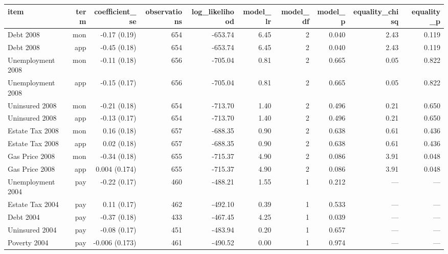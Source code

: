 \begin{tabular}{lrrrrrrrrr}
\toprule
item & term & coefficient\_se & observations & log\_likelihood & model\_lr & model\_df & model\_p & equality\_chisq & equality\_p \\
\midrule
Debt 2008 & mon & -0.17 (0.19) & 654 & -653.74 & 6.45 & 2 & 0.040 & 2.43 & 0.119 \\
Debt 2008 & app & -0.45 (0.18) & 654 & -653.74 & 6.45 & 2 & 0.040 & 2.43 & 0.119 \\
Unemployment 2008 & mon & -0.11 (0.18) & 656 & -705.04 & 0.81 & 2 & 0.665 & 0.05 & 0.822 \\
Unemployment 2008 & app & -0.15 (0.17) & 656 & -705.04 & 0.81 & 2 & 0.665 & 0.05 & 0.822 \\
Uninsured 2008 & mon & -0.21 (0.18) & 654 & -713.70 & 1.40 & 2 & 0.496 & 0.21 & 0.650 \\
Uninsured 2008 & app & -0.13 (0.17) & 654 & -713.70 & 1.40 & 2 & 0.496 & 0.21 & 0.650 \\
Estate Tax 2008 & mon & 0.16 (0.18) & 657 & -688.35 & 0.90 & 2 & 0.638 & 0.61 & 0.436 \\
Estate Tax 2008 & app & 0.02 (0.18) & 657 & -688.35 & 0.90 & 2 & 0.638 & 0.61 & 0.436 \\
Gas Price 2008 & mon & -0.34 (0.18) & 655 & -715.37 & 4.90 & 2 & 0.086 & 3.91 & 0.048 \\
Gas Price 2008 & app & 0.004 (0.174) & 655 & -715.37 & 4.90 & 2 & 0.086 & 3.91 & 0.048 \\
Unemployment 2004 & pay & -0.22 (0.17) & 460 & -488.21 & 1.55 & 1 & 0.212 & — & — \\
Estate Tax 2004 & pay & 0.11 (0.17) & 462 & -492.10 & 0.39 & 1 & 0.533 & — & — \\
Debt 2004 & pay & -0.37 (0.18) & 433 & -467.45 & 4.25 & 1 & 0.039 & — & — \\
Uninsured 2004 & pay & -0.08 (0.17) & 451 & -483.94 & 0.20 & 1 & 0.657 & — & — \\
Poverty 2004 & pay & -0.006 (0.173) & 461 & -490.52 & 0.00 & 1 & 0.974 & — & — \\
\bottomrule
\end{tabular}
